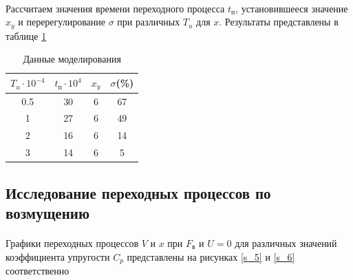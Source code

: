 \documentclass[a4paper,12pt]{article}
\renewcommand{\arraystretch}{1.5}
\begin{document}
	\paragraph{}Рассчитаем значения времени переходного процесса $t_\text{п}$, установившееся значение $x_y$ и перерегулирование $\sigma$ при различных $T_u$ для $x$. Результаты представлены в таблице \ref{t_3}
	\begin{table}[h]
		\centering
		\caption{Данные моделирования}
		\renewcommand{\arraystretch}{2} 
		\renewcommand{\tabcolsep}{1.65cm}
		\begin{center}
			\begin{tabular}{|c|c|c|c|}
				\hline
				$T_u\cdot 10^{-4}$ & $t_\text{п} \cdot 10^4$ & $x_y$ & $\sigma$(\%)  \\ \hline
				0.5 & 30 & 6 & 67 \\ \hline
				1 & 27 & 6 & 49 \\ \hline
				2 & 16 & 6 & 14 \\ \hline
				3 & 14 & 6 & 5 \\ \hline
			\end{tabular}
		\end{center}
		\label{t_3}
	\end{table}
	
	\newpage
	\begin{center}
	\section{Исследование переходных процессов по возмущению}
	\end{center}
			\paragraph {} Графики переходных процессов $V$ и $x$ при $F_{\text{в}}$ и $U=0$ для различных значений коэффициента упругости $C_p$ представлены на рисунках \ref{s_5} и \ref{s_6} соответственно\\
			
\end{document}
